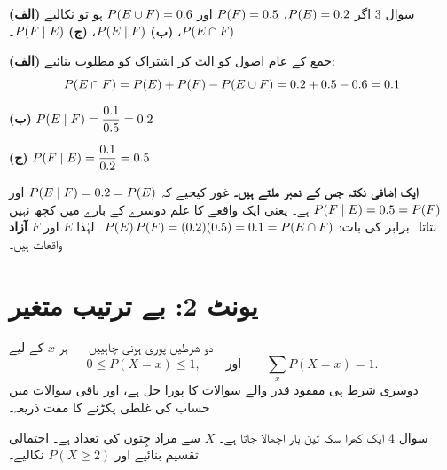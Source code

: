 \begin{sawal}{سوال \textenglish{3}}
اگر \(\prob{E}=0.2\)، \(\prob{F}=0.5\) اور \(\prob{E\cup F}=0.6\) ہو تو نکالیے
\textbf{(الف)} \(\prob{E\cap F}\)، \textbf{(ب)} \(\prob{E\mid F}\)،
\textbf{(ج)} \(\prob{F\mid E}\)۔
\end{sawal}

\begin{hal}
\textbf{(الف)} جمع کے عام اصول کو الٹ کر اشتراک کو مطلوب بنائیے:
\[
\prob{E\cap F}=\prob{E}+\prob{F}-\prob{E\cup F}=0.2+0.5-0.6=0.1
\]

\textbf{(ب)} \(\displaystyle \prob{E\mid F}=\frac{0.1}{0.5}=0.2\)

\textbf{(ج)} \(\displaystyle \prob{F\mid E}=\frac{0.1}{0.2}=0.5\)

\medskip
\textbf{ایک اضافی نکتہ جس کے نمبر ملتے ہیں۔}
غور کیجیے کہ \(\prob{E\mid F}=0.2=\prob{E}\) اور \(\prob{F\mid E}=0.5=\prob{F}\)
ہے۔ یعنی ایک واقعے کا علم دوسرے کے بارے میں کچھ نہیں بتاتا۔ برابر کی بات:
\(\prob{E}\prob{F}=(0.2)(0.5)=0.1=\prob{E\cap F}\)۔ لہٰذا \(E\) اور \(F\)
\textbf{آزاد} واقعات ہیں۔

\end{hal}

\section*{یونٹ \textenglish{2}: بے ترتیب متغیر}

\begin{nukta}
دو شرطیں پوری ہونی چاہییں --- ہر \(x\) کے لیے
\[
0\le P(X=x)\le 1,
\qquad\text{اور}\qquad
\sum_{x} P(X=x)=1 .
\]
دوسری شرط ہی مفقود قدر والے سوالات کا پورا حل ہے، اور باقی سوالات میں حساب کی
غلطی پکڑنے کا مفت ذریعہ۔
\end{nukta}

\begin{sawal}{سوال \textenglish{4}}
ایک کھرا سکہ تین بار اچھالا جاتا ہے۔ \(X\) سے مراد چِتوں کی تعداد ہے۔ احتمالی
تقسیم بنائیے اور \(P(X\ge 2)\) نکالیے۔
\end{sawal}

